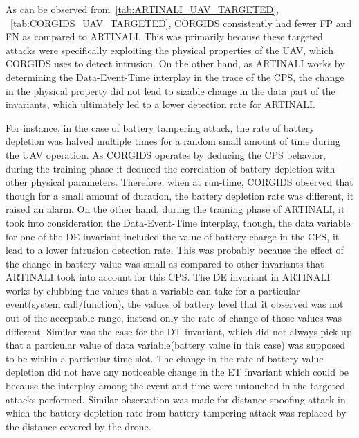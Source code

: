 As can be observed from~\autoref{tab:ARTINALI_UAV_TARGETED}, ~\autoref{tab:CORGIDS_UAV_TARGETED}, \ac{CORGIDS} consistently had fewer \ac{FP} and \ac{FN} as compared to ARTINALI. This was primarily because these targeted attacks were specifically exploiting the physical properties of the \ac{UAV}, which \ac{CORGIDS} uses to detect intrusion. On the other hand, as ARTINALI works by determining the Data-Event-Time interplay in the trace of the \ac{CPS}, the change in the physical property did not lead to sizable change in the data part of the invariants, which ultimately led to a lower detection rate for ARTINALI.

For instance, in the case of battery tampering attack, the rate of battery depletion was halved multiple times for a random small amount of time during the \ac{UAV} operation. As \ac{CORGIDS} operates by deducing the \ac{CPS} behavior, during the training phase it deduced the correlation of battery depletion with other physical parameters. Therefore, when at run-time, \ac{CORGIDS}  observed that though for a small amount of duration, the battery depletion rate was different, it raised an alarm. On the other hand, during the training phase of ARTINALI, it took into consideration the Data-Event-Time interplay, though, the data variable for one of the D\textbar E invariant included the value of battery charge in the \ac{CPS}, it lead to a lower intrusion detection rate. This was probably because the effect of the change in battery value was small as compared to other invariants that ARTINALI took into account for this \ac{CPS}. The D\textbar E invariant in ARTINALI works by clubbing the values that a variable can take for a particular event(system call/function), the values of battery level that it observed was not out of the acceptable range, instead only the rate of change of those values was different. Similar was the case for the D\textbar T invariant, which did not always pick up that a particular value of data variable(battery value in this case) was supposed to be within a particular time slot. The change in the rate of battery value depletion did not have any noticeable change in the E\textbar T invariant which could be because the interplay among the event and time were untouched in the targeted attacks performed. Similar observation was made for distance spoofing attack in which the battery depletion rate from battery tampering attack was replaced by the distance covered by the drone.

